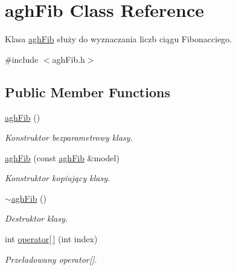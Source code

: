 \hypertarget{classaghFib}{\section{agh\-Fib \-Class \-Reference}
\label{classaghFib}
}


\-Klasa \hyperlink{classaghFib}{agh\-Fib} służy do wyznaczania liczb ciągu \-Fibonacciego.  




{\ttfamily \#include $<$agh\-Fib.\-h$>$}

\subsection*{\-Public \-Member \-Functions}
\begin{DoxyCompactItemize}
\item 
\hypertarget{classaghFib_a29620a78632c6786822cc15f70aa6670}{\hyperlink{classaghFib_a29620a78632c6786822cc15f70aa6670}{agh\-Fib} ()}\label{classaghFib_a29620a78632c6786822cc15f70aa6670}

\begin{DoxyCompactList}\small\item\em \-Konstruktor bezparametrowy klasy. \end{DoxyCompactList}\item 
\hypertarget{classaghFib_aefe683a84a497327ab8c2cfebc371d7c}{\hyperlink{classaghFib_aefe683a84a497327ab8c2cfebc371d7c}{agh\-Fib} (const \hyperlink{classaghFib}{agh\-Fib} \&model)}\label{classaghFib_aefe683a84a497327ab8c2cfebc371d7c}

\begin{DoxyCompactList}\small\item\em \-Konstruktor kopiujący klasy. \end{DoxyCompactList}\item 
\hypertarget{classaghFib_a7407b6fa45436f126eec8b876b16d223}{\hyperlink{classaghFib_a7407b6fa45436f126eec8b876b16d223}{$\sim$agh\-Fib} ()}\label{classaghFib_a7407b6fa45436f126eec8b876b16d223}

\begin{DoxyCompactList}\small\item\em \-Destruktor klasy. \end{DoxyCompactList}\item 
int \hyperlink{classaghFib_af8a5c60f9b345fd034afe1b3b1692e57}{operator\mbox{[}$\,$\mbox{]}} (int index)
\begin{DoxyCompactList}\small\item\em \-Przeładowany operator\mbox{[}\mbox{]}. \end{DoxyCompactList}\end{DoxyCompactItemize}


